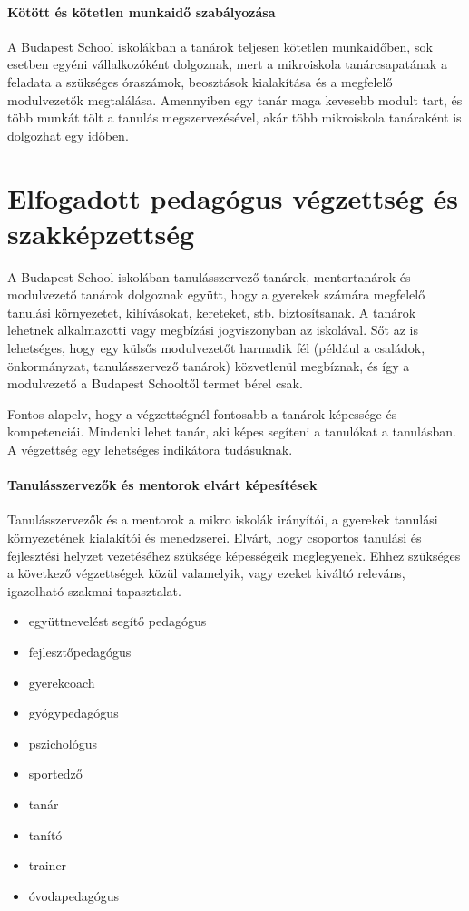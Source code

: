\paragraph{Kötött és kötetlen munkaidő szabályozása}

A Budapest School  iskolákban a tanárok teljesen kötetlen munkaidőben, sok esetben egyéni vállalkozóként dolgoznak, mert a mikroiskola tanárcsapatának a feladata a szükséges óraszámok, beosztások kialakítása és a megfelelő modulvezetők megtalálása. Amennyiben egy tanár maga kevesebb modult tart, és több munkát tölt a tanulás megszervezésével, akár több mikroiskola tanáraként is dolgozhat egy időben.

\section{Elfogadott pedagógus végzettség és szakképzettség}

A Budapest School iskolában tanulásszervező tanárok, mentortanárok és modulvezető tanárok dolgoznak együtt, hogy a gyerekek számára megfelelő tanulási környezetet, kihívásokat, kereteket, stb. biztosítsanak. A tanárok lehetnek alkalmazotti vagy megbízási jogviszonyban az iskolával. Sőt az is lehetséges, hogy egy külsős modulvezetőt harmadik fél (például a családok, önkormányzat, tanulásszervező tanárok) közvetlenül megbíznak, és így a modulvezető a Budapest Schooltől termet bérel csak.

Fontos alapelv, hogy a végzettségnél fontosabb a tanárok képessége és kompetenciái. Mindenki lehet tanár, aki képes segíteni a tanulókat a tanulásban. A végzettség egy lehetséges indikátora tudásuknak. 

\paragraph{Tanulásszervezők és mentorok elvárt képesítések} Tanulásszervezők és a mentorok a mikro iskolák irányítói, a gyerekek tanulási környezetének kialakítói és menedzserei. Elvárt, hogy csoportos tanulási és fejlesztési helyzet vezetéséhez szüksége képességeik meglegyenek. Ehhez szükséges a következő végzettségek közül valamelyik, vagy ezeket kiváltó releváns, igazolható szakmai tapasztalat.
\begin{itemize}
\item együttnevelést segítő pedagógus
\item fejlesztőpedagógus
\item gyerekcoach
\item gyógypedagógus
\item pszichológus
\item sportedző
\item tanár
\item tanító
\item trainer
\item óvodapedagógus
\end{itemize}

